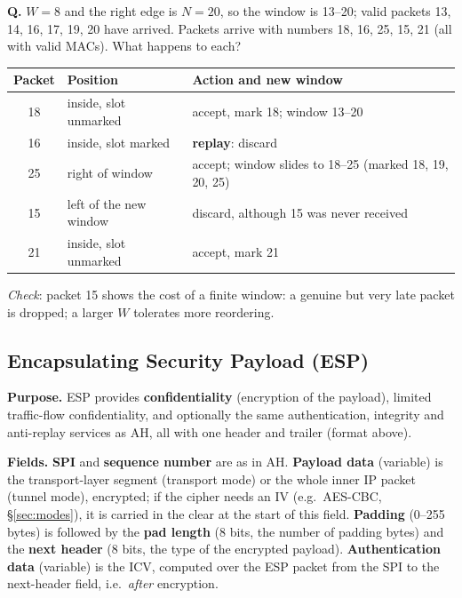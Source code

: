 \begin{worked}
\textbf{Q.} $W = 8$ and the right edge is $N = 20$, so the window is 13--20; valid packets 13, 14, 16, 17, 19, 20 have arrived. Packets arrive with numbers 18, 16, 25, 15, 21 (all with valid MACs). What happens to each?
\begin{center}\small
{}
\begin{tabular}{@{}c l l@{}}
\toprule
Packet & Position & Action and new window\\
\midrule
18 & inside, slot unmarked & accept, mark 18; window 13--20\\
16 & inside, slot marked & \textbf{replay}: discard\\
25 & right of window & accept; window slides to 18--25 (marked 18, 19, 20, 25)\\
15 & left of the new window & discard, although 15 was never received\\
21 & inside, slot unmarked & accept, mark 21\\
\bottomrule
\end{tabular}
\end{center}
\emph{Check}: packet 15 shows the cost of a finite window: a genuine but very late packet is dropped; a larger $W$ tolerates more reordering.
\end{worked}

\subsection{Encapsulating Security Payload (ESP) \hot\new}

\textbf{Purpose.} ESP provides \textbf{confidentiality} (encryption of the payload), limited traffic-flow confidentiality, and optionally the same authentication, integrity and anti-replay services as AH, all with one header and trailer (format above).

\textbf{Fields.} \textbf{SPI} and \textbf{sequence number} are as in AH. \textbf{Payload data} (variable) is the transport-layer segment (transport mode) or the whole inner IP packet (tunnel mode), encrypted; if the cipher needs an IV (e.g.\ AES-CBC, \S\ref{sec:modes}), it is carried in the clear at the start of this field. \textbf{Padding} (0--255 bytes) is followed by the \textbf{pad length} (8 bits, the number of padding bytes) and the \textbf{next header} (8 bits, the type of the encrypted payload). \textbf{Authentication data} (variable) is the ICV, computed over the ESP packet from the SPI to the next-header field, i.e.\ \emph{after} encryption.

